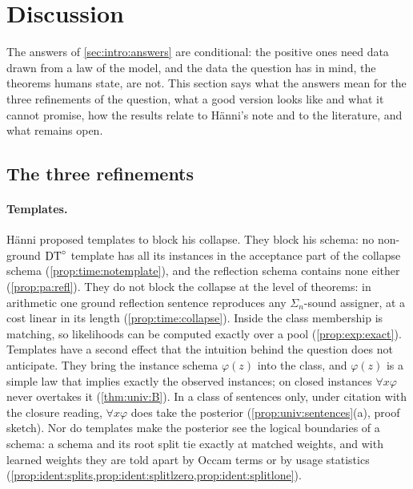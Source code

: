 
\section{Discussion}\label{sec:disc}

The answers of \cref{sec:intro:answers} are conditional: the positive ones need data drawn from a law of the model, and the data the question has in mind, the theorems humans state, are not. This section says what the answers mean for the three refinements of the question, what a good version looks like and what it cannot promise, how the results relate to H\"anni's note and to the literature, and what remains open.

\subsection{The three refinements}\label{sec:disc:proposal}

\paragraph{Templates.} H\"anni proposed templates to block his collapse. They block his schema: no non-ground $\mathrm{DT}^{\circ}$ template has all its instances in the acceptance part of the collapse schema (\cref{prop:time:notemplate}), and the reflection schema contains none either (\cref{prop:pa:refl}). They do not block the collapse at the level of theorems: in arithmetic one ground reflection sentence reproduces any $\Sigma_n$-sound assigner, at a cost linear in its length (\cref{prop:time:collapse}). Inside the class membership is matching, so likelihoods can be computed exactly over a pool (\cref{prop:exp:exact}). Templates have a second effect that the intuition behind the question does not anticipate. They bring the instance schema $\varphi(z)$ into the class, and $\varphi(z)$ is a simple law that implies exactly the observed instances; on closed instances $\forall x\varphi$ never overtakes it (\cref{thm:univ:B}). In a class of sentences only, under citation with the closure reading, $\forall x\varphi$ does take the posterior (\cref{prop:univ:sentences}(a), proof sketch). Nor do templates make the posterior see the logical boundaries of a schema: a schema and its root split tie exactly at matched weights, and with learned weights they are told apart by Occam terms or by usage statistics (\cref{prop:ident:splits,prop:ident:splitlzero,prop:ident:splitlone}).

